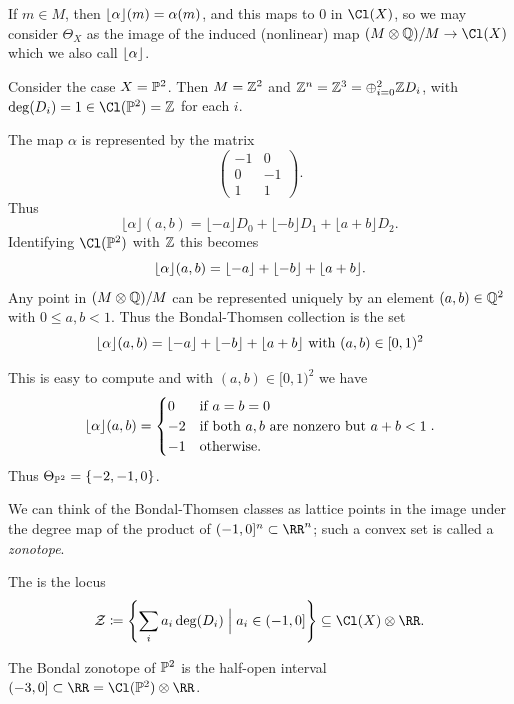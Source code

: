 \documentclass{amsart}
\begin{document}
If $m\in M$, then $\alp(m) = \alpha(m)$, and this  maps to $0$ in $\Cl(X)$, so we may
consider $\Theta_X$ as the image of the induced (nonlinear) map $(M\otimes \QQ) / M \to \Cl(X)$ which we also
call $\alp$.

\begin{example} Consider the case $X=\P^{2}$. Then $M=\ZZ^2$ and $\ZZ^{n} = \ZZ^{3} =  \oplus_{i=0}^{2} \ZZ D_{i}$, with $\deg(D_{i}) = 1 \in \Cl(\PP^{2}) = \ZZ$
for each $i$. 

The map $\alpha$ is represented by the matrix
    \[
    \begin{pmatrix}
        -1&0\\ 0&-1\\1&1
    \end{pmatrix} .
    \]   
    Thus
        \[
    \lfloor \alpha \rfloor (a,b) = \lfloor -a\rfloor D_0 + \lfloor -b\rfloor D_1 + \lfloor a+b \rfloor D_2.
    \]
    Identifying $\Cl(\PP^{2})$ with $\ZZ$ this becomes 
      \[
    \alp(a,b) =\lfloor -a\rfloor + \lfloor -b\rfloor + \lfloor a+b\rfloor .
    \]
    Any point in $(M\otimes \QQ)/ M$ can be represented uniquely by an element $(a,b)\in \QQ^2$ with $0\leq a,b <1$. Thus the Bondal-Thomsen collection is the set
           \[
    \alp(a,b) =\lfloor -a\rfloor + \lfloor -b\rfloor + \lfloor a+b\rfloor \text{ with } (a,b) \in [0,1)^{2}
    \]

This is easy to compute and with $(a,b) \in [0,1)^{2}$ we have
$$
\alp(a,b) = \begin{cases}
0 & \text{if } a=b=0\\
-2& \text{if both } a,b \text{ are nonzero but } a+b<1\\
-1 & \text{otherwise.}
\end{cases}.
$$
Thus $\Theta_{\P^{2}} = \{-2, -1, 0\}$.
\end{example}

We can think of the Bondal-Thomsen classes as lattice points in the image
under the degree map of the product
of $(-1,0]^{n}\subset \RR^{n}$; such a convex set is called a \emph{zonotope}. 

\begin{defn}\label{defn:BondalZonotope}
    The  is the locus
    \[
    \mathcal Z\ce \left\{\sum_{i} a_i \deg(D_i) \mathrel{\Big|} a_i \in (-1,0]\right\}
    \subseteq \Cl(X)\otimes \RR.
    \]
\end{defn}

\begin{example}
    The Bondal zonotope of $\PP^2$ is the half-open interval $(-3,0] \subset \RR = \Cl(\P^{2})\otimes \RR$.\end{example}
    
\end{document}
